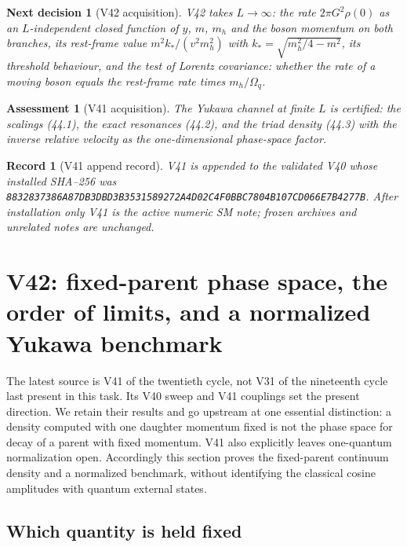 \documentclass[11pt]{article}
\newtheorem{decision}[theorem]{Next decision}
\newtheorem{assessment}[theorem]{Assessment}
\newtheorem{record}[theorem]{Record}
\theoremstyle{remark}
\begin{document}
\begin{decision}[V42 acquisition]
\label{dec:v20v41-next}
V42 takes \(L\to\infty\): the rate \(2\pi G^2\rho(0)\) as an
\(L\)-independent closed function of \(y\), \(m\), \(m_h\) and the
boson momentum on both branches, its rest-frame value
\(m^2k_*/(v^2m_h^2)\) with \(k_*=\sqrt{m_h^2/4-m^2}\), its threshold
behaviour, and the test of Lorentz covariance: whether the rate of a
moving boson equals the rest-frame rate times \(m_h/\Omega_q\).
\end{decision}

\begin{assessment}[V41 acquisition]
\label{ass:v20v41}
The Yukawa channel at finite \(L\) is certified: the scalings (44.1),
the exact resonances (44.2), and the triad density (44.3) with the
inverse relative velocity as the one-dimensional phase-space factor.
\end{assessment}

\begin{record}[V41 append record]
\label{rec:v20v41}
V41 is appended to the validated V40 whose installed SHA--256 was
\texttt{8832837386A87DB3DBD3B3531589272A4D02C4F0BBC7804B107CD066E7B4277B}.
After installation only V41 is the active numeric SM note; frozen
archives and unrelated notes are unchanged.
\end{record}



\section{V42: fixed-parent phase space, the order of limits, and a normalized Yukawa benchmark}
\label{sec:v20v42}

The latest source is V41 of the twentieth cycle, not V31 of the
nineteenth cycle last present in this task.  Its V40 sweep and V41
couplings set the present direction.  We retain their results and go
upstream at one essential distinction: a density computed with one
daughter momentum fixed is not the phase space for decay of a parent
with fixed momentum.  V41 also explicitly leaves one-quantum
normalization open.  Accordingly this section proves the fixed-parent
continuum density and a normalized benchmark, without identifying the
classical cosine amplitudes with quantum external states.

\subsection{Which quantity is held fixed}
\end{document}
